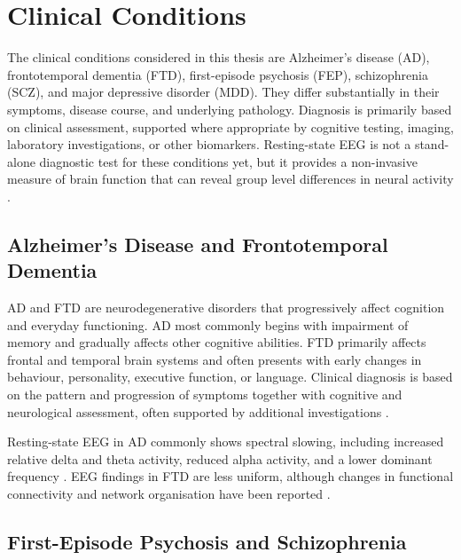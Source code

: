 \section{Clinical Conditions}\label{sec:bg_conditions}

The clinical conditions considered in this thesis are Alzheimer's disease (AD), frontotemporal dementia (FTD), first-episode psychosis (FEP), schizophrenia (SCZ), and major depressive disorder (MDD). They differ substantially in their symptoms, disease course, and underlying pathology. Diagnosis is primarily based on clinical assessment, supported where appropriate by cognitive testing, imaging, laboratory investigations, or other biomarkers. Resting-state EEG is not a stand-alone diagnostic test for these conditions yet, but it provides a non-invasive measure of brain function that can reveal group level differences in neural activity \parencite{royDeepLearningBasedElectroencephalography2019,vanderVinneFrontalAlphaAsymmetry2017}.

\subsection{Alzheimer's Disease and Frontotemporal Dementia}\label{sec:bg_adftd}

AD and FTD are neurodegenerative disorders that progressively affect cognition and everyday functioning. AD most commonly begins with impairment of memory and gradually affects other cognitive abilities. FTD primarily affects frontal and temporal brain systems and often presents with early changes in behaviour, personality, executive function, or language. Clinical diagnosis is based on the pattern and progression of symptoms together with cognitive and neurological assessment, often supported by additional investigations \parencite{miltiadousDatasetScalpEEG2023a}.

Resting-state EEG in AD commonly shows spectral slowing, including increased relative delta and theta activity, reduced alpha activity, and a lower dominant frequency \parencite{jeongEEGDynamicsAlzheimers2004,jelicQuantitativeElectroencephalographyPower1996}. EEG findings in FTD are less uniform, although changes in functional connectivity and network organisation have been reported \parencite{dehaanFunctionalNeuralNetwork2009,yuDifferentFunctionalConnectivity2016}.

\subsection{First-Episode Psychosis and Schizophrenia}\label{sec:bg_fep}

